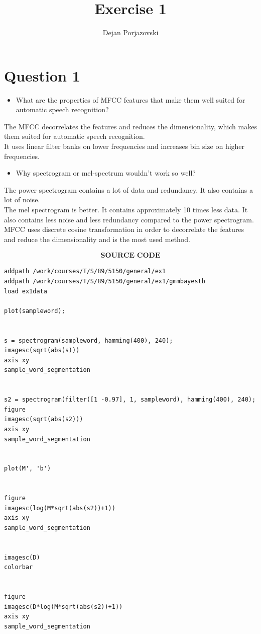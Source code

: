 \documentclass[17pt]{article}
\begin{document}
\title{{Exercise 1}}
\author{Dejan Porjazovski}
\maketitle


\section{Question 1}
\begin{itemize}
	\item{What are the properties of MFCC features that make them well 			suited for automatic speech recognition?}
\end{itemize}
The MFCC decorrelates the features and reduces the dimensionality, which
makes them suited for automatic speech recognition. \\
It uses linear filter banks on lower frequencies and increases bin size on higher frequencies.

\begin{itemize}
	\item{Why spectrogram or mel-spectrum wouldn't work so well?}
\end{itemize}
The power spectrogram contains a lot of data and redundancy. It also
contains a lot of noise. \\
The mel spectrogram is better. It contains approximately 10 times less data. It also contains less noise and less redundancy compared to the power spectrogram. \\
MFCC uses discrete cosine transformation in order to decorrelate the
features and reduce the dimensionality and is the most used method.


\begin{align}
\textbf{SOURCE CODE}
\end{align}

\begin{lstlisting}
addpath /work/courses/T/S/89/5150/general/ex1
addpath /work/courses/T/S/89/5150/general/ex1/gmmbayestb
load ex1data

plot(sampleword);


s = spectrogram(sampleword, hamming(400), 240);
imagesc(sqrt(abs(s)))
axis xy
sample_word_segmentation


s2 = spectrogram(filter([1 -0.97], 1, sampleword), hamming(400), 240);
figure
imagesc(sqrt(abs(s2)))
axis xy
sample_word_segmentation


plot(M', 'b')


figure
imagesc(log(M*sqrt(abs(s2))+1))
axis xy
sample_word_segmentation


imagesc(D)
colorbar


figure
imagesc(D*log(M*sqrt(abs(s2))+1))
axis xy
sample_word_segmentation
\end{lstlisting}
\end{document}
